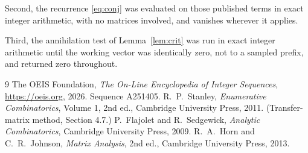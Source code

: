 \documentclass[11pt,a4paper]{article}
\theoremstyle{plain}
\theoremstyle{definition}
\begin{document}
Second, the recurrence \eqref{eq:conj} was evaluated on those published terms in exact
integer arithmetic, with no matrices involved, and vanishes wherever it applies.

Third, the annihilation test of Lemma~\ref{lem:crit} was run in exact integer arithmetic
until the working vector was identically zero, not to a sampled prefix, and returned zero
throughout.

\begin{thebibliography}{9}
 The OEIS Foundation, \emph{The On-Line Encyclopedia of Integer
Sequences}, \url{https://oeis.org}, 2026. Sequence A251405.
 R.~P.~Stanley, \emph{Enumerative Combinatorics}, Volume 1, 2nd ed.,
Cambridge University Press, 2011. (Transfer-matrix method, Section 4.7.)
 P.~Flajolet and R.~Sedgewick, \emph{Analytic Combinatorics}, Cambridge
University Press, 2009.
 R.~A.~Horn and C.~R.~Johnson, \emph{Matrix Analysis}, 2nd ed., Cambridge
University Press, 2013.
\end{thebibliography}
\end{document}
